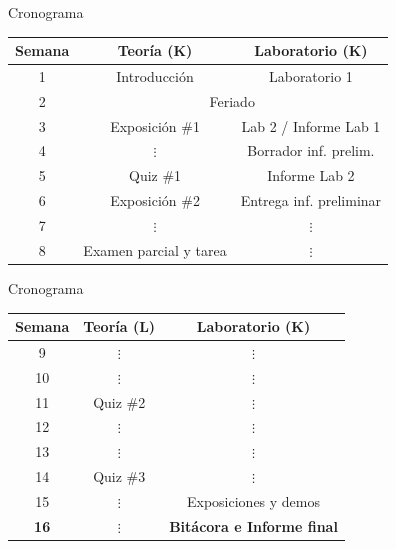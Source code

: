\documentclass[xcolor=dvipsnames]{beamer}
\newcommand{\pageframe}[1]{\frame{\begin{center}{ \Huge #1 }\end{center}}}
\begin{document}
\pageframe{Cronograma}

\begin{frame}{Cronograma}
 \begin{center}
  \begin{tabular}{|c|c|c|}\hline
   Semana & \multicolumn{1}{c|}{Teoría (K)} & \multicolumn{1}{c|}{Laboratorio (K)} \\ \hline \hline
   1 & Introducción & Laboratorio 1 \\ \hline
   2 & \multicolumn{2}{c|}{Feriado} \\ \hline
   3 & Exposición \#1 & Lab 2 / Informe Lab 1   \\ \hline
   4 & \multicolumn{1}{c|}{$\vdots$} & Borrador inf. prelim. \\ \hline
   5 & Quiz \#1 & Informe Lab 2     \\ \hline
   6 & Exposición \#2  & Entrega inf. preliminar     \\ \hline
   7 & \multicolumn{1}{c|}{$\vdots$} & \multicolumn{1}{c|}{$\vdots$}     \\ \hline
   8 & Examen parcial y tarea & \multicolumn{1}{c|}{$\vdots$}     \\ \hline
  \end{tabular}
 \end{center}
\end{frame}

\begin{frame}{Cronograma}
 \begin{center}
  \begin{tabular}{|c|c|c|}\hline
   Semana & \multicolumn{1}{c|}{Teoría (L)} & \multicolumn{1}{c|}{Laboratorio (K)} \\ \hline \hline

   9 & \multicolumn{1}{c|}{$\vdots$} & \multicolumn{1}{c|}{$\vdots$}     \\ \hline
   10 & \multicolumn{1}{c|}{$\vdots$} & \multicolumn{1}{c|}{$\vdots$}     \\ \hline
   11 & Quiz \#2 & \multicolumn{1}{c|}{$\vdots$}     \\ \hline
   12 & \multicolumn{1}{c|}{$\vdots$} & \multicolumn{1}{c|}{$\vdots$} \\ \hline
   13 & \multicolumn{1}{c|}{$\vdots$} & \multicolumn{1}{c|}{$\vdots$} \\ \hline
   14 & Quiz \#3 & \multicolumn{1}{c|}{$\vdots$}  \\\hline
   15 & \multicolumn{1}{c|}{$\vdots$} & Exposiciones y demos  \\ \hline
   \textbf{16} & \multicolumn{1}{c|}{$\vdots$} & \textbf{Bitácora e Informe final} \\ \hline
  \end{tabular}

 \end{center}

\end{frame}
\end{document}
